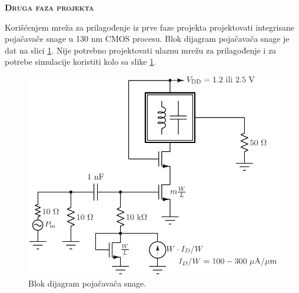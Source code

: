 \documentclass[a4paper]{article}
\begin{document}
\begin{center}
\large{\textbf{\textsc{Druga faza projekta}}}
\end{center}

Korišćenjem mreža za prilagođenje iz prve faze projekta projektovati integrisane pojačavače snage u 130 nm CMOS procesu.
Blok dijagram pojačavača snage je dat na slici \ref{fig:blockpa}.
Nije potrebno projektovati ulaznu mrežu za prilagođenje i za potrebe simulacije koristiti kolo sa slike \ref{fig:blockpa}.

\begin{figure}[!h]
\begin{center}
\includegraphics[scale=0.75]{fig/blockpa.pdf}
\caption{Blok dijagram pojačavača snage.}
\label{fig:blockpa}
\end{center}
\end{figure}
\end{document}
